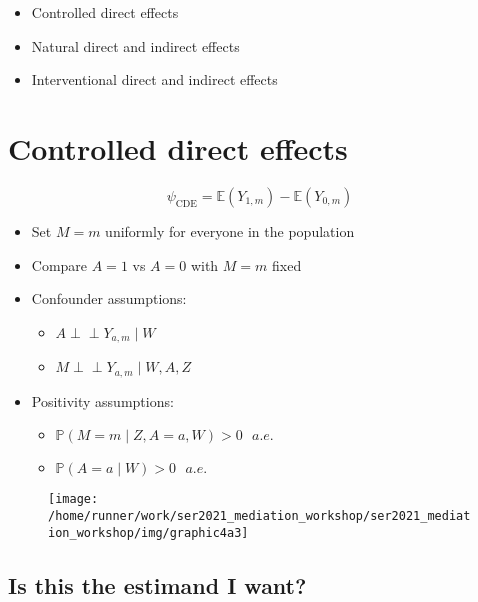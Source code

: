 \documentclass[
  12pt, krantz2,
]{book}
\providecommand{\tightlist}{%
  \setlength{\itemsep}{0pt}\setlength{\parskip}{0pt}}
\theoremstyle{definition}
\theoremstyle{definition}
\theoremstyle{definition}
\newcommand{\indep}{\mbox{$\perp\!\!\!\perp$}}
\renewcommand{\P}{\mathbb{P}}
\newcommand{\E}{\mathbb{E}}
\newcommand{\1}{\mathbbm{1}}
\begin{document}
\begin{itemize}
\tightlist
\item
  Controlled direct effects
\item
  Natural direct and indirect effects
\item
  Interventional direct and indirect effects
\end{itemize}

\hypertarget{controlled-direct-effects}{%
\section{Controlled direct effects}\label{controlled-direct-effects}}

\begin{equation*}
  \psi_{\text{CDE}} = \E(Y_{1,m}) - \E(Y_{0,m})
\end{equation*}

\begin{itemize}
\tightlist
\item
  Set \(M=m\) uniformly for everyone in the population
\item
  Compare \(A=1\) vs \(A=0\) with \(M=m\) fixed
\item
  Confounder assumptions:

  \begin{itemize}
  \tightlist
  \item
    \(A \indep Y_{a,m} \mid W\)
  \item
    \(M \indep Y_{a,m} \mid W, A, Z\)
  \end{itemize}
\item
  Positivity assumptions:

  \begin{itemize}
  \tightlist
  \item
    \(\P(M = m \mid Z, A=a, W) > 0 \text{  } a.e.\)
  \item
    \(\P(A=a \mid W) > 0 \text{  } a.e.\)
  \end{itemize}
\end{itemize}

\begin{figure}

{\centering \texttt{[image: /home/runner/work/ser2021\_mediation\_workshop/ser2021\_mediation\_workshop/img/graphic4a3]} 

}

\end{figure}

\hypertarget{is-this-the-estimand-i-want}{%
\subsection*{Is this the estimand I want?}\label{is-this-the-estimand-i-want}}
\end{document}
